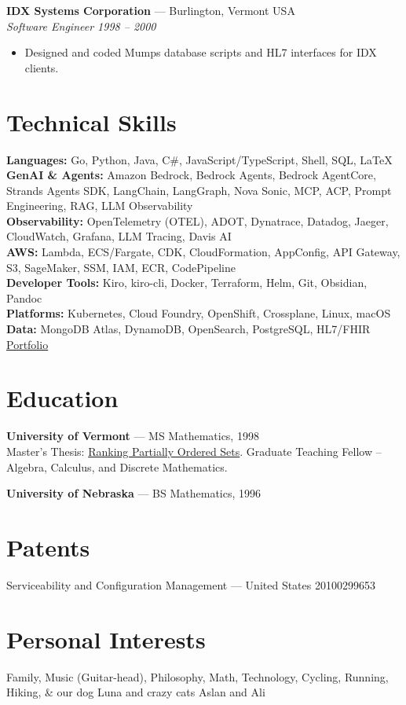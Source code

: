 \documentclass[10pt,letterpaper]{article}
\begin{document}
\textbf{IDX Systems Corporation} --- Burlington, Vermont USA\\
\textit{Software Engineer \hfill 1998 -- 2000}
\begin{itemize}
\item Designed and coded Mumps database scripts and HL7 interfaces for IDX clients.
\end{itemize}

\section{Technical Skills}
\textbf{Languages:} Go, Python, Java, C\#, JavaScript/TypeScript, Shell, SQL, \LaTeX\\
\textbf{GenAI \& Agents:} Amazon Bedrock, Bedrock Agents, Bedrock AgentCore, Strands Agents SDK, LangChain, LangGraph, Nova Sonic, MCP, ACP, Prompt Engineering, RAG, LLM Observability\\
\textbf{Observability:} OpenTelemetry (OTEL), ADOT, Dynatrace, Datadog, Jaeger, CloudWatch, Grafana, LLM Tracing, Davis AI\\
\textbf{AWS:} Lambda, ECS/Fargate, CDK, CloudFormation, AppConfig, API Gateway, S3, SageMaker, SSM, IAM, ECR, CodePipeline\\
\textbf{Developer Tools:} Kiro, kiro-cli, Docker, Terraform, Helm, Git, Obsidian, Pandoc\\
\textbf{Platforms:} Kubernetes, Cloud Foundry, OpenShift, Crossplane, Linux, macOS\\
\textbf{Data:} MongoDB Atlas, DynamoDB, OpenSearch, PostgreSQL, HL7/FHIR\\
\href{https://github.com/jasonmimick/portfolio}{Portfolio}

\section{Education}
\textbf{University of Vermont} --- MS Mathematics, 1998\\
Master's Thesis: \href{http://citeseerx.ist.psu.edu/viewdoc/download?doi=10.1.1.28.2960&rep=rep1&type=pdf}{Ranking Partially Ordered Sets}. Graduate Teaching Fellow -- Algebra, Calculus, and Discrete Mathematics.

\textbf{University of Nebraska} --- BS Mathematics, 1996

\section{Patents}
Serviceability and Configuration Management --- United States 20100299653

\section{Personal Interests}
Family, Music (Guitar-head), Philosophy, Math, Technology, Cycling, Running, Hiking, \& our dog Luna and crazy cats Aslan and Ali
\end{document}
